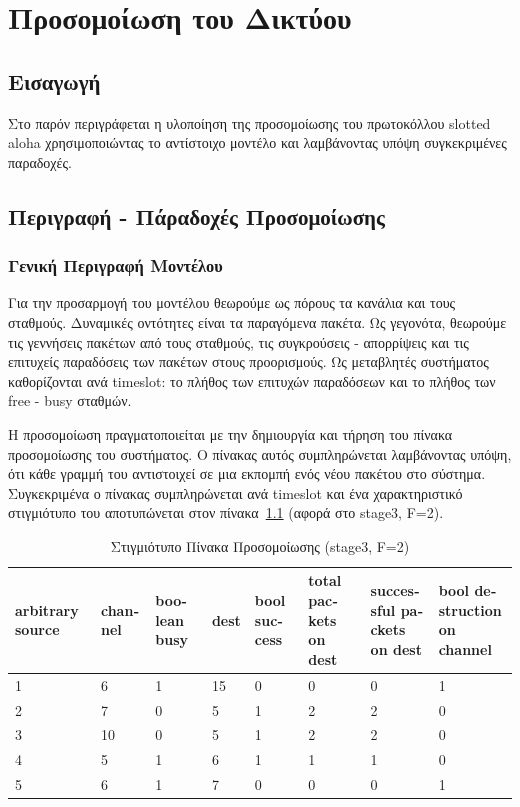 \documentclass[12pt]{report}
\begin{document}
\chapter{Προσομοίωση του Δικτύου}\label{ch3}

\section{Εισαγωγή}
Στο παρόν περιγράφεται η υλοποίηση της προσομοίωσης του πρωτοκόλλου \textlatin{slotted aloha} χρησιμοποιώντας το αντίστοιχο μοντέλο και λαμβάνοντας υπόψη συγκεκριμένες παραδοχές.

\section{Περιγραφή - Πάραδοχές Προσομοίωσης}\label{model}
\subsection{Γενική Περιγραφή Μοντέλου}
Για την προσαρμογή του μοντέλου θεωρούμε ως πόρους τα κανάλια και τους σταθμούς. Δυναμικές οντότητες είναι τα παραγόμενα πακέτα. Ως γεγονότα, θεωρούμε τις γεννήσεις πακέτων από τους σταθμούς, τις συγκρούσεις - απορρίψεις και τις επιτυχείς παραδόσεις των πακέτων στους προορισμούς. Ως μεταβλητές συστήματος καθορίζονται ανά \textlatin{timeslot}: το πλήθος των επιτυχών παραδόσεων και το πλήθος των \textlatin{free - busy} σταθμών.

Η προσομοίωση πραγματοποιείται με την δημιουργία και τήρηση του πίνακα προσομοίωσης του συστήματος. Ο πίνακας αυτός συμπληρώνεται λαμβάνοντας υπόψη, ότι κάθε γραμμή του αντιστοιχεί σε μια εκπομπή ενός νέου πακέτου στο σύστημα. Συγκεκριμένα ο πίνακας συμπληρώνεται ανά \textlatin{timeslot} και ένα χαρακτηριστικό στιγμιότυπο του αποτυπώνεται στον πίνακα~\ref{tab01} (αφορά στο \textlatin{stage3, F=2}).

\begin{table}[h!]
\centering
\scriptsize
\begin{tabular}{||p{1cm}|p{1cm}|p{1cm}|p{1cm}|p{1cm}|p{1cm}|p{1cm}|p{1cm}||}
\hline
\textlatin{arbitrary source} & \textlatin{channel} & \textlatin{boolean busy} & \textlatin{dest} & \textlatin{bool success} & \textlatin{total packets on dest} & \textlatin{successful packets on dest} & \textlatin{bool destruction on channel} \\ [0.5ex]
\hline\hline
1 & 6  & 1 & 15 & 0 & 0 & 0 & 1\\ 
2 & 7  & 0 & 5  & 1 & 2 & 2 & 0\\
3 & 10 & 0 & 5  & 1 & 2 & 2 & 0\\
4 & 5  & 1 & 6  & 1 & 1 & 1 & 0\\
5 & 6  & 1 & 7  & 0 & 0 & 0 & 1\\ [1ex] 
\hline
\end{tabular}
\caption{Στιγμιότυπο Πίνακα Προσομοίωσης (\textlatin{stage3, F=2})}
\label{tab01}
\end{table}
\end{document}
